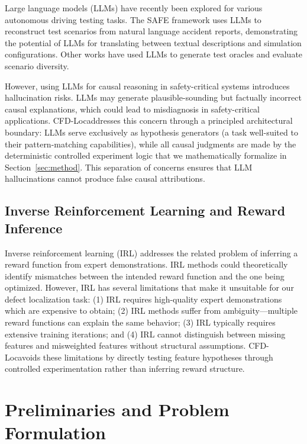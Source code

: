 \documentclass[conference]{IEEEtran}
\theoremstyle{plain}
\newcommand{\methodname}{CFD-Loc}
\begin{document}
Large language models (LLMs) have recently been explored for various autonomous driving testing tasks. The SAFE framework \cite{safe2026} uses LLMs to reconstruct test scenarios from natural language accident reports, demonstrating the potential of LLMs for translating between textual descriptions and simulation configurations. Other works have used LLMs to generate test oracles and evaluate scenario diversity.

However, using LLMs for causal reasoning in safety-critical systems introduces hallucination risks. LLMs may generate plausible-sounding but factually incorrect causal explanations, which could lead to misdiagnosis in safety-critical applications. \methodname addresses this concern through a principled architectural boundary: LLMs serve exclusively as hypothesis generators (a task well-suited to their pattern-matching capabilities), while all causal judgments are made by the deterministic controlled experiment logic that we mathematically formalize in Section~\ref{sec:method}. This separation of concerns ensures that LLM hallucinations cannot produce false causal attributions.

\subsection{Inverse Reinforcement Learning and Reward Inference}

Inverse reinforcement learning (IRL) \cite{ng2000policy} addresses the related problem of inferring a reward function from expert demonstrations. IRL methods could theoretically identify mismatches between the intended reward function and the one being optimized. However, IRL has several limitations that make it unsuitable for our defect localization task: (1) IRL requires high-quality expert demonstrations which are expensive to obtain; (2) IRL methods suffer from ambiguity---multiple reward functions can explain the same behavior; (3) IRL typically requires extensive training iterations; and (4) IRL cannot distinguish between missing features and misweighted features without structural assumptions. \methodname avoids these limitations by directly testing feature hypotheses through controlled experimentation rather than inferring reward structure.

\section{Preliminaries and Problem Formulation}
\label{sec:prelim}
\end{document}
